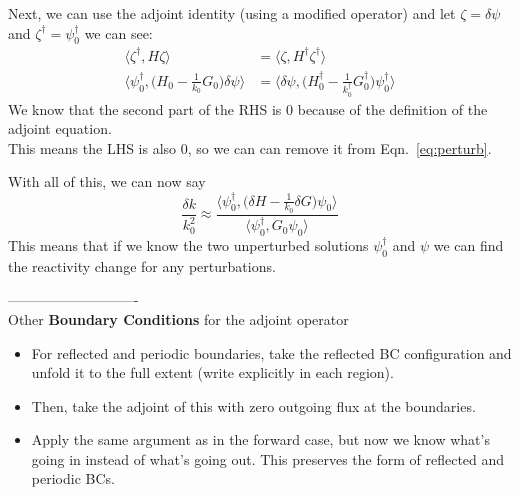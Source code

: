 \documentclass[12pt]{article}
\begin{document}
Next, we can use the adjoint identity (using a modified operator) and let $\zeta = \delta\psi$ and $\zeta^{\dagger} = \psi_0^{\dagger}$ we can see:
\begin{align*}
\langle\zeta^{\dagger}, H \zeta\rangle &= \langle\zeta, H^{\dagger} \zeta^{\dagger}\rangle \\
%
\langle \psi_0^{\dagger}, \bigl(H_0 - \frac{1}{k_0}G_0 \bigr)\delta \psi \rangle &= \langle \delta \psi,  \bigl(H_0^{\dagger} - \frac{1}{k_0^{\dagger}}G_0^{\dagger} \bigr)\psi_0^{\dagger} \rangle
\end{align*}
We know that the second part of the RHS is $0$ because of the definition of the adjoint equation.\\
This means the LHS is also $0$, so we can can remove it from Eqn.~\ref{eq:perturb}.

With all of this, we can now say
\[
\frac{\delta k}{k_0^2} \approx \frac{\langle \psi_0^{\dagger},\bigl(\delta H - \frac{1}{k_0}\delta G\bigr)\psi_0 \rangle}{\langle \psi_0^{\dagger}, G_0\psi_0 \rangle}
\]
This means that if we know the two unperturbed solutions $\psi_0^{\dagger}$ and $\psi$ we can find the reactivity change for any perturbations.

----------------------------\\
Other \textbf{Boundary Conditions} for the adjoint operator

\begin{itemize}
\item For reflected and periodic boundaries, take the reflected BC configuration and unfold it to the full extent (write explicitly in each region).
\item Then, take the adjoint of this with zero outgoing flux at the boundaries.
\item Apply the same argument as in the forward case, but now we know what's going in instead of what's going out. This preserves the form of reflected and periodic BCs.
\end{itemize}
\end{document}
